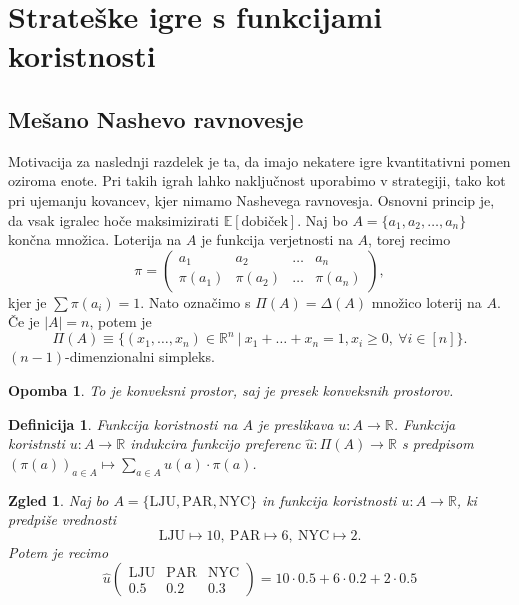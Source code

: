 \documentclass[10pt, a4paper]{article}
\newtheorem{defi}[izr]{Definicija}
\newenvironment{noticeB}{%
  \tcolorbox[%
  notitle,
  empty,
  enhanced,  %
  breakable,
  coltext=black,
  colback=white, 
  fontupper=\rmfamily,
  noparskip,
  sharp corners,
  boxrule=-1pt,  %
  frame hidden,
  left=7pt,  %
  right=7pt,
  top=5pt,
  bottom=5pt,
  before skip=2.5ex plus 2pt,
  after skip=2.5ex plus 2pt,
  borderline west = {1.5pt}{-0.1pt}{blue!30!black}, %
  overlay unbroken and last={%
    \draw[color=black, line width=1.25pt]
    ($(frame.south west)+(1.pt, -0.1pt)$) -- ++(2em, 0);
  }
  ]}
{\endtcolorbox}
\newenvironment{definicija}{\begin{noticeB}\begin{defi}}{%
    \end{defi}\end{noticeB}}
\newtheorem*{opomba}{Opomba}
\newtheorem{zgled}[izr]{Zgled}
\newcommand{\R}{\mathbb {R}}
\begin{document}
\section{Strateške igre s funkcijami koristnosti}

\subsection{Mešano Nashevo ravnovesje}

Motivacija za naslednji razdelek je ta, da imajo nekatere igre kvantitativni pomen oziroma enote.
Pri takih igrah lahko naključnost uporabimo v strategiji, tako kot pri ujemanju kovancev, kjer nimamo Nashevega ravnovesja.
Osnovni princip je, da vsak igralec hoče maksimizirati $\mathbb{E} [\text{dobiček}]$.
Naj bo $A = \{a_1, a_2, \dots, a_n\}$ končna množica. Loterija na $A$ je funkcija verjetnosti na $A$, torej recimo 
$$\pi = \begin{pmatrix}
  a_1 & a_2 & \dots & a_n\\
  \pi (a_1) & \pi (a_2) & \dots & \pi (a_n)
\end{pmatrix},$$
kjer je $\sum \pi (a_i) = 1$. Nato označimo s $\Pi (A) = \Delta(A)$ množico loterij na $A$.
Če je $|A| = n$, potem je $$\Pi(A) \equiv \{(x_1, \dots, x_n) \in \R^n\ |\ x_1 + \dots + x_n = 1, x_i \geq 0,\ \forall i \in [n]\}.$$
$(n - 1)$-dimenzionalni simpleks.

\begin{opomba}
  To je konveksni prostor, saj je presek konveksnih prostorov.
\end{opomba}

\begin{definicija}
  Funkcija koristnosti na $A$ je preslikava $u: A \to \R$.
  Funkcija koristnsti $u: A \to \R$ indukcira funkcijo preferenc $\hat{u} : \Pi(A) \to \R$
  s predpisom $(\pi(a))_{a \in A} \mapsto \sum_{a \in A} u(a) \cdot \pi (a)$.
\end{definicija}

\begin{zgled}
  Naj bo $A = \{\mathrm{LJU}, \mathrm{PAR}, \mathrm{NYC}\}$ in funkcija koristnosti 
  $u: A \to \R$, ki predpiše vrednosti
  $$\mathrm{LJU} \mapsto 10,\ \mathrm{PAR} \mapsto 6,\ \mathrm{NYC} \mapsto 2.$$
  Potem je recimo 
  $$\hat{u} \begin{pmatrix}
    \mathrm{LJU} & \mathrm{PAR} & \mathrm{NYC}\\
    0.5 & 0.2 & 0.3
  \end{pmatrix} = 10 \cdot 0.5 + 6 \cdot 0.2 + 2 \cdot  0.5$$
\end{zgled}
\end{document}
